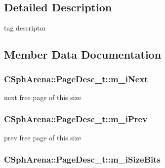 \subsection{Detailed Description}
tag descriptor 

\subsection{Member Data Documentation}
\hypertarget{structCSphArena_1_1PageDesc__t_a8fda40b33983c4f353c132699fa1d760}{
\subsubsection[{m\-\_\-i\-Next}]{ C\-Sph\-Arena\-::\-Page\-Desc\-\_\-t\-::m\-\_\-i\-Next}}\label{structCSphArena_1_1PageDesc__t_a8fda40b33983c4f353c132699fa1d760}


next free page of this size 

\hypertarget{structCSphArena_1_1PageDesc__t_af802be36b99169f785e5b2aad24f0a48}{
\subsubsection[{m\-\_\-i\-Prev}]{ C\-Sph\-Arena\-::\-Page\-Desc\-\_\-t\-::m\-\_\-i\-Prev}}\label{structCSphArena_1_1PageDesc__t_af802be36b99169f785e5b2aad24f0a48}


prev free page of this size 

\hypertarget{structCSphArena_1_1PageDesc__t_a07be4ba4a01a265014f0dcd9c60ef83b}{
\subsubsection[{m\-\_\-i\-Size\-Bits}]{ C\-Sph\-Arena\-::\-Page\-Desc\-\_\-t\-::m\-\_\-i\-Size\-Bits}}\label{structCSphArena_1_1PageDesc__t_a07be4ba4a01a265014f0dcd9c60ef83b}



